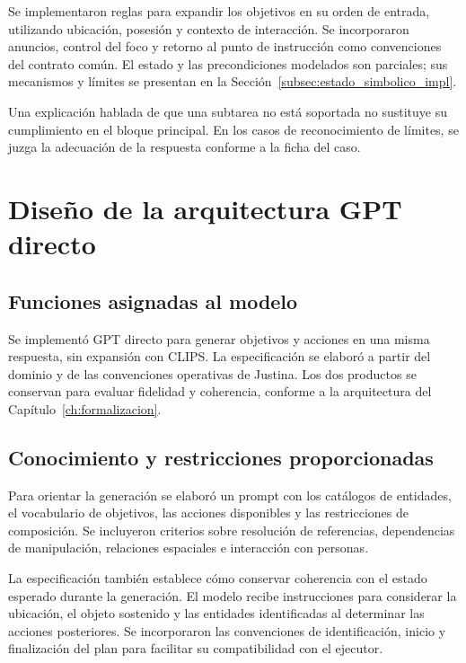 Se implementaron reglas para expandir los objetivos en su orden de entrada, utilizando ubicación, posesión y contexto de interacción. Se incorporaron anuncios, control del foco y retorno al punto de instrucción como convenciones del contrato común. El estado y las precondiciones modelados son parciales; sus mecanismos y límites se presentan en la Sección~\ref{subsec:estado_simbolico_impl}.

Una explicación hablada de que una subtarea no está soportada no sustituye su cumplimiento en el bloque principal. En los casos de reconocimiento de límites, se juzga la adecuación de la respuesta conforme a la ficha del caso.

\section{Diseño de la arquitectura GPT directo}
\label{sec:diseno_gpt_directo}

\subsection{Funciones asignadas al modelo}

Se implementó GPT directo para generar objetivos y acciones en una misma respuesta, sin expansión con CLIPS. La especificación se elaboró a partir del dominio y de las convenciones operativas de Justina. Los dos productos se conservan para evaluar fidelidad y coherencia, conforme a la arquitectura del Capítulo~\ref{ch:formalizacion}.

\subsection{Conocimiento y restricciones proporcionadas}

Para orientar la generación se elaboró un prompt con los catálogos de
entidades, el vocabulario de objetivos, las acciones disponibles y las
restricciones de composición. Se incluyeron criterios sobre resolución
de referencias, dependencias de manipulación, relaciones espaciales e
interacción con personas.

La especificación también establece cómo conservar coherencia con el
estado esperado durante la generación. El modelo recibe instrucciones
para considerar la ubicación, el objeto sostenido y las entidades
identificadas al determinar las acciones posteriores. Se incorporaron
las convenciones de identificación, inicio y finalización del plan para
facilitar su compatibilidad con el ejecutor.

